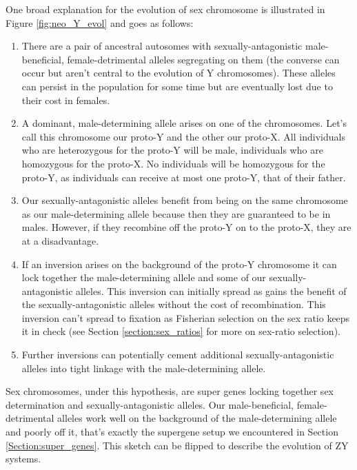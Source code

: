 One broad explanation for the evolution of sex chromosome is illustrated in Figure \ref{fig:neo_Y_evol} and goes as follows:\\
\begin{enumerate}
\item There are a pair of ancestral autosomes with sexually-antagonistic male-beneficial, female-detrimental alleles segregating on them (the converse can occur but aren't central to the evolution of Y chromosomes). These alleles can persist in the population for some time but are eventually lost due to their cost in females. 
\item A dominant, male-determining allele arises on one of the chromosomes. Let's call this chromosome our proto-Y and the other our proto-X. All individuals who are heterozygous for the proto-Y will be male, individuals who are homozygous for the proto-X. No individuals will be homozygous for the proto-Y, as individuals can receive at most one proto-Y, that of their father. 
\item Our sexually-antagonistic alleles benefit from being on the same chromosome as our male-determining allele because then they are guaranteed to be in males. However, if they recombine off the proto-Y on to the proto-X, they are at a disadvantage.
\item If an inversion arises on the background of the proto-Y chromosome it can lock together the male-determining allele and some of our sexually-antagonistic alleles. This inversion can initially spread as gains the benefit of the sexually-antagonistic alleles without the cost of recombination. This inversion can't spread to fixation as Fisherian selection on the sex ratio keeps it in check (see Section \ref{section:sex_ratios} for more on sex-ratio selection).
\item Further inversions can potentially cement additional sexually-antagonistic alleles into tight linkage with the male-determining allele.
\end{enumerate}
Sex chromosomes, under this hypothesis, are super genes locking together sex determination and sexually-antagonistic alleles. Our male-beneficial, female-detrimental alleles work well on the background of the male-determining allele and poorly off it, that's exactly the supergene setup we encountered in Section \ref{Section:super_genes}. This sketch can be flipped to describe the evolution of ZY systems. 


